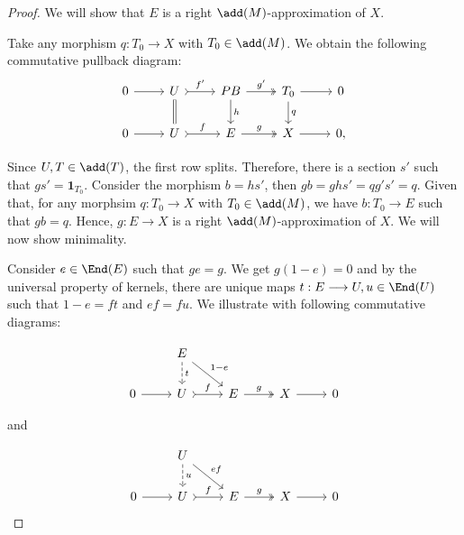\begin{proof}
 We will show that $E$ is a right $\add(M)$-approximation of $X$. 

\bigskip
Take any morphism $q : T_0 \longrightarrow X$ with $T_0 \in \add(M)$. We obtain the following commutative pullback diagram: 
\[\begin{tikzcd}
	0 & U & PB & T_0 & 0 \\ 0 & U & E & X & 0 ,
	\arrow[from=1-1, to=1-2]
	\arrow["f'",tail, from=1-2, to=1-3]
	\arrow["g'",two heads,from=1-3, to=1-4]
	\arrow[from=1-4, to=1-5]
    \arrow[from=2-1, to=2-2]
	\arrow["f",tail, from=2-2, to=2-3]
	\arrow["g",two heads,from=2-3, to=2-4]
	\arrow[from=2-4, to=2-5]
    \arrow[equal,from=1-2, to=2-2]
	\arrow["h",from=1-3, to=2-3]
    \arrow["q",from=1-4, to=2-4]
 \end{tikzcd} \]

Since $U,T \in \add(T)$, the first row splits. Therefore, there is a section $s'$ such that $gs' = \mathbf{1}_{T_0}$. Consider the morphism $b = hs'$, then $gb = ghs' = qg's' = q$. Given that, for any morphsim $q : T_0 \longrightarrow X$ with $T_0 \in \add(M)$, we have $b : T_0 \longrightarrow E$ such that $gb =q$. Hence, $g : E \longrightarrow X$ is a right $\add(M)$-approximation of $X$. We will now show minimality.

\bigskip
Consider $ e \in \End(E)$ such that $ge = g$. We get $g(1-e)=0$ and by the universal property of kernels, there are unique maps $t : E \longrightarrow U , u \in \End(U)$ such that $1-e = ft$ and $ef=fu$. We illustrate with following commutative diagrams:

\[
\begin{tikzcd}
& E\\ 0 & U & E & X & 0
\arrow["t",dashed,from=1-2, to=2-2]
\arrow["1-e",from=1-2, to=2-3]
\arrow[from=2-1, to=2-2]
\arrow["f", tail, from=2-2, to=2-3]
\arrow["g", two heads, from=2-3, to=2-4]
\arrow[from=2-4, to=2-5]
\end{tikzcd}
\]

and

\[
\begin{tikzcd}
& U\\ 0 & U & E & X & 0
\arrow["u",dashed,from=1-2, to=2-2]
\arrow["ef",from=1-2, to=2-3]
\arrow[from=2-1, to=2-2]
\arrow["f", tail, from=2-2, to=2-3]
\arrow["g", two heads, from=2-3, to=2-4]
\arrow[from=2-4, to=2-5]
\end{tikzcd}
\]

\bigskip


\end{proof}
